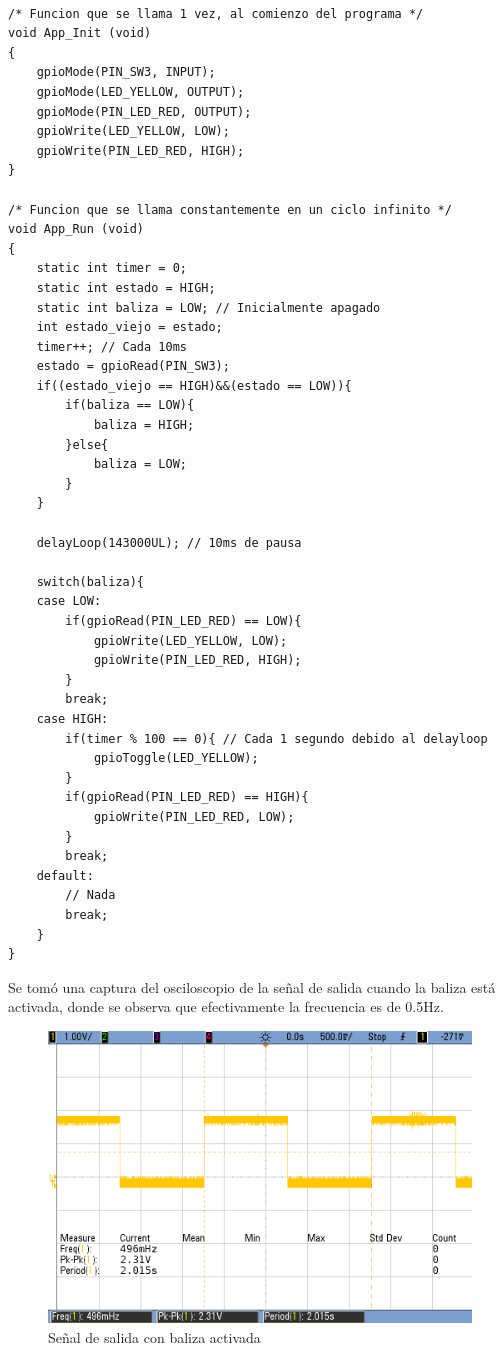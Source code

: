 \documentclass{article}
\begin{document}
\begin{lstlisting}

/* Funcion que se llama 1 vez, al comienzo del programa */
void App_Init (void)
{
	gpioMode(PIN_SW3, INPUT);
    gpioMode(LED_YELLOW, OUTPUT);
    gpioMode(PIN_LED_RED, OUTPUT);
    gpioWrite(LED_YELLOW, LOW);
    gpioWrite(PIN_LED_RED, HIGH);
}

/* Funcion que se llama constantemente en un ciclo infinito */
void App_Run (void)
{
	static int timer = 0;
	static int estado = HIGH;
	static int baliza = LOW; // Inicialmente apagado
	int estado_viejo = estado;
	timer++; // Cada 10ms
	estado = gpioRead(PIN_SW3);
	if((estado_viejo == HIGH)&&(estado == LOW)){
		if(baliza == LOW){
			baliza = HIGH;
		}else{
			baliza = LOW;
		}
	}

	delayLoop(143000UL); // 10ms de pausa

	switch(baliza){
	case LOW:
		if(gpioRead(PIN_LED_RED) == LOW){
		    gpioWrite(LED_YELLOW, LOW);
		    gpioWrite(PIN_LED_RED, HIGH);
		}
		break;
	case HIGH:
		if(timer % 100 == 0){ // Cada 1 segundo debido al delayloop
			gpioToggle(LED_YELLOW);
		}
		if(gpioRead(PIN_LED_RED) == HIGH){
			gpioWrite(PIN_LED_RED, LOW);
		}
		break;
	default:
		// Nada
		break;
	}
}
\end{lstlisting}

\newpage
Se tomó una captura del osciloscopio de la señal de salida cuando la baliza está activada, donde se observa que efectivamente la frecuencia es de 0.5Hz.

\begin{figure}[ht]
	\centering
	\includegraphics[width=0.7 \textwidth]
	{../Imagenes/baliza.png}
	\caption{Señal de salida con baliza activada}
\end{figure}
\end{document}
